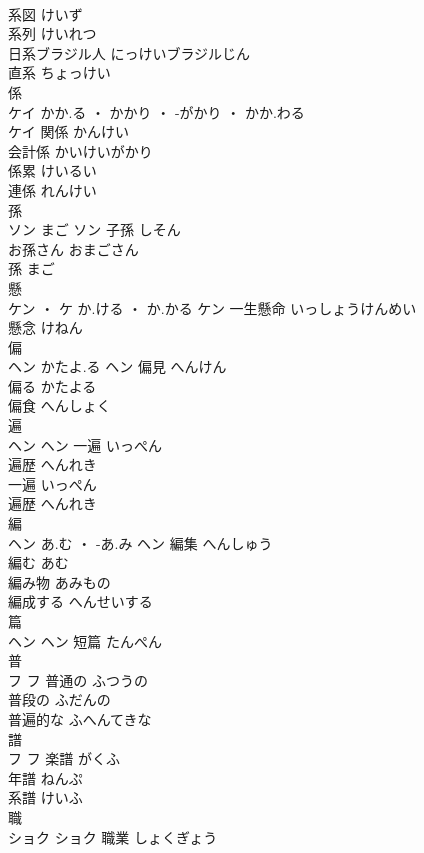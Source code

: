 \documentclass[8pt]{extreport}
\begin{document}
\begin{CJK}{UTF8}{min}
\\	系図	けいず	
\\	系列	けいれつ	
\\	日系ブラジル人	にっけいブラジルじん	
\\	直系	ちょっけい	
\\	係	
\\	ケイ	かか.る ・ かかり ・ -がかり ・ かか.わる
\\	ケイ	関係	かんけい	
\\	会計係	かいけいがかり	
\\	係累	けいるい	
\\	連係	れんけい	
\\	孫	
\\	ソン	まご	ソン	子孫	しそん	
\\	お孫さん	おまごさん	
\\	孫	まご	
\\	懸	
\\	ケン ・ ケ	か.ける ・ か.かる	ケン	一生懸命	いっしょうけんめい	
\\	懸念	けねん	
\\	偏	
\\	ヘン	かたよ.る	ヘン	偏見	へんけん	
\\	偏る	かたよる	
\\	偏食	へんしょく	
\\	遍	
\\	ヘン		ヘン	一遍	いっぺん	
\\	遍歴	へんれき	
\\	一遍	いっぺん	
\\	遍歴	へんれき	
\\	編	
\\	ヘン	あ.む ・ -あ.み	ヘン	編集	へんしゅう	
\\	編む	あむ	
\\	編み物	あみもの	
\\	編成する	へんせいする	
\\	篇	
\\	ヘン		ヘン													短篇	たんぺん	
\\	普	
\\	フ		フ	普通の	ふつうの	
\\	普段の	ふだんの	
\\	普遍的な	ふへんてきな	
\\	譜	
\\	フ		フ	楽譜	がくふ	
\\	年譜	ねんぷ	
\\	系譜	けいふ	
\\	職	
\\	ショク		ショク	職業	しょくぎょう	

\end{CJK}
\end{document}
